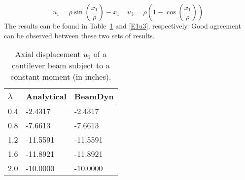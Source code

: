 \begin{equation}
    \label{E1Analytical}
    u_1 = \rho \sin \left( \frac{x_1}{\rho} \right) - x_1~~~~~u_3 = \rho
\left(1-\cos\left(\frac{x_1}{\rho}\right) \right)
\end{equation}
The results can be found in Table~\ref{E1u1} and \ref{E1u3}, respectively. Good agreement can be observed between these two sets of results.
\begin{table}[tbp]
\centering 
\caption{Axial displacement $u_1$ of a cantilever beam subject to a constant moment (in inches).}
\label{E1u1} 
	\begin{tabular}{| l | l | l | }
    	\hline
    	$\lambda$ & Analytical & BeamDyn  \\ \hline
    	0.4       & -2.4317    & -2.4317  \\ \hline
    	0.8       & -7.6613    & -7.6613  \\ \hline
    	1.2       & -11.5591   & -11.5591 \\ \hline
    	1.6       & -11.8921   & -11.8921 \\ \hline
    	2.0       & -10.0000   & -10.0000 \\ \hline
    \end{tabular}
\end{table}

